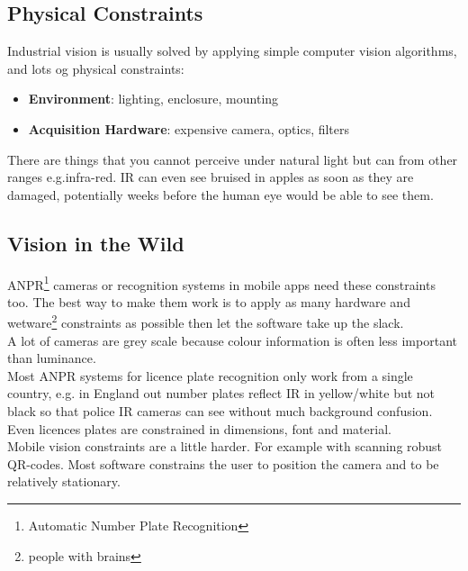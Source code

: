 \documentclass{article}
\begin{document}
	\subsection{Physical Constraints}
	Industrial vision is usually solved by applying simple computer vision algorithms, and lots og physical constraints:
	\begin{itemize}
		\item \textbf{Environment}: lighting, enclosure, mounting
		\item \textbf{Acquisition Hardware}: expensive camera, optics, filters
	\end{itemize}
	There are things that you cannot perceive under natural light but can from other ranges e.g.infra-red. IR can even see bruised in apples as soon as they are damaged, potentially weeks before the human eye would be able to see them.
	\subsection{Vision in the Wild}
	ANPR\footnote{Automatic Number Plate Recognition} cameras or recognition systems in mobile apps need these constraints too. The best way to make them work is to apply as many hardware and wetware\footnote{people with brains} constraints as possible then let the software take up the slack.\\
	A lot of cameras are grey scale because colour information is often less important than luminance.\\
	Most ANPR systems for licence plate recognition only work from a single country, e.g. in England out number plates reflect IR in yellow/white but not black so that police IR cameras can see without much background confusion. Even licences plates are constrained in dimensions, font and material.\\
	Mobile vision constraints are a little harder. For example with scanning robust QR-codes. Most software constrains the user to position the camera and to be relatively stationary.
\end{document}
